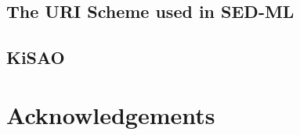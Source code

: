 \documentclass[11pt]{article}
\begin{document}

\tableofcontents
\newpage


  

  

  

  \subsection{The URI Scheme used in SED-ML}  
  

  \subsection{KiSAO}
  

  

  


  

\section*{Acknowledgements}

\end{document}
